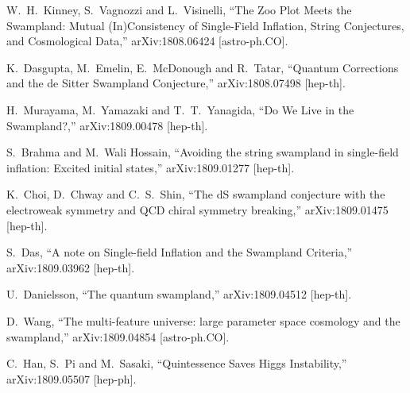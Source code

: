 \documentclass[11pt,a4paper]{article}
\begin{document}
\begin{thebibliography}{99}
  W.~H.~Kinney, S.~Vagnozzi and L.~Visinelli,
  ``The Zoo Plot Meets the Swampland: Mutual (In)Consistency of Single-Field Inflation, String Conjectures, and Cosmological Data,''
  arXiv:1808.06424 [astro-ph.CO].


  K.~Dasgupta, M.~Emelin, E.~McDonough and R.~Tatar,
  ``Quantum Corrections and the de Sitter Swampland Conjecture,''
  arXiv:1808.07498 [hep-th].


  H.~Murayama, M.~Yamazaki and T.~T.~Yanagida,
  ``Do We Live in the Swampland?,''
  arXiv:1809.00478 [hep-th].


  S.~Brahma and M.~Wali Hossain,
  ``Avoiding the string swampland in single-field inflation: Excited initial states,''
  arXiv:1809.01277 [hep-th].


  K.~Choi, D.~Chway and C.~S.~Shin,
  ``The dS swampland conjecture with the electroweak symmetry and QCD chiral symmetry breaking,''
  arXiv:1809.01475 [hep-th].


  S.~Das,
  ``A note on Single-field Inflation and the Swampland Criteria,''
  arXiv:1809.03962 [hep-th].


  U.~Danielsson,
  ``The quantum swampland,''
  arXiv:1809.04512 [hep-th].


  D.~Wang,
  ``The multi-feature universe: large parameter space cosmology and the swampland,''
  arXiv:1809.04854 [astro-ph.CO].


  C.~Han, S.~Pi and M.~Sasaki,
  ``Quintessence Saves Higgs Instability,''
  arXiv:1809.05507 [hep-ph].


\end{thebibliography}
\end{document}
